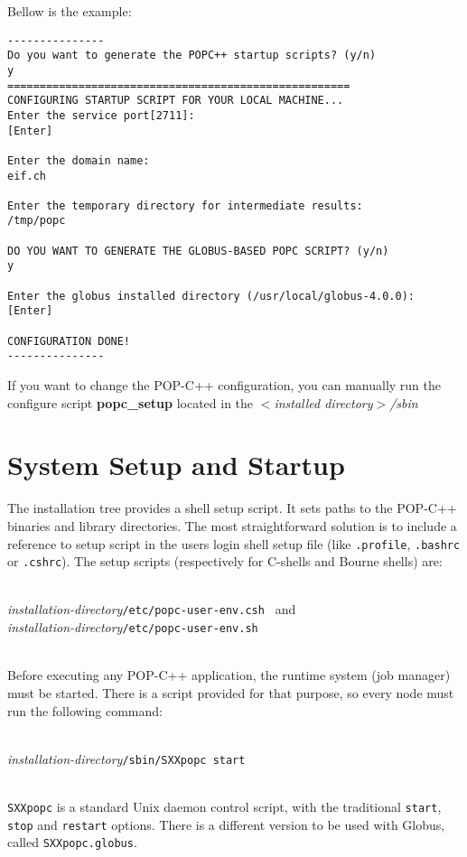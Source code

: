 \begin{enumerate}
\begin{petitem}
\end{petitem}

Bellow is the example:

\begin{verbatim}
---------------
Do you want to generate the POPC++ startup scripts? (y/n)
y
=====================================================
CONFIGURING STARTUP SCRIPT FOR YOUR LOCAL MACHINE...
Enter the service port[2711]:
[Enter]

Enter the domain name:
eif.ch

Enter the temporary directory for intermediate results:
/tmp/popc

DO YOU WANT TO GENERATE THE GLOBUS-BASED POPC SCRIPT? (y/n)
y

Enter the globus installed directory (/usr/local/globus-4.0.0):
[Enter]

CONFIGURATION DONE!
---------------
\end{verbatim}

\end{enumerate}

If you want to change the POP-C++ configuration, you can manually run
the configure script \textbf{popc\_setup} located in the
\emph{$<$installed directory$>$/sbin}




\section{System Setup and Startup}

The installation tree provides a shell setup script. It sets
paths to the POP-C++ binaries and library directories. The most
straightforward solution is to include a reference to setup script in
the users login shell setup file (like \texttt{.profile}, \texttt{.bashrc} or
\texttt{.cshrc}). The setup scripts (respectively for C-shells and
Bourne shells) are:

\textit{~\\
installation-directory}\texttt{/etc/popc-user-env.csh } and\\
\textit{installation-directory}\texttt{/etc/popc-user-env.sh}\\
~

Before executing any POP-C++ application, the runtime system (job manager) must be
started. There is a script provided for that purpose, so every node
must run the following command:

\textit{~\\
installation-directory}\texttt{/sbin/SXXpopc start}\\
~

\texttt{SXXpopc} is a standard Unix daemon control script, with the
traditional \texttt{start}, \texttt{stop} and \texttt{restart} options.
There is a different version to be used with Globus, called
\texttt{SXXpopc.globus}.
